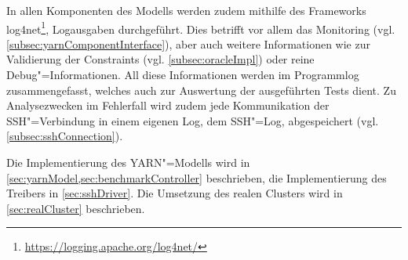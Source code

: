 In allen Komponenten des Modells werden zudem mithilfe des Frameworks log4net\footnote{\url{https://logging.apache.org/log4net/}}, Logausgaben durchgeführt.
Dies betrifft vor allem das Monitoring (vgl. \cref{subsec:yarnComponentInterface}), aber auch weitere Informationen wie zur Validierung der Constraints (vgl. \cref{subsec:oracleImpl}) oder reine Debug"=Informationen.
All diese Informationen werden im Programmlog zusammengefasst, welches auch zur Auswertung der ausgeführten Tests dient.
Zu Analysezwecken im Fehlerfall wird zudem jede Kommunikation der SSH"=Verbindung in einem eigenen Log, dem SSH"=Log, abgespeichert (vgl. \cref{subsec:sshConnection}).

Die Implementierung des YARN"=Modells wird in \cref{sec:yarnModel,sec:benchmarkController} beschrieben, die Implementierung des Treibers in \cref{sec:sshDriver}.
Die Umsetzung des realen Clusters wird in \cref{sec:realCluster} beschrieben.
